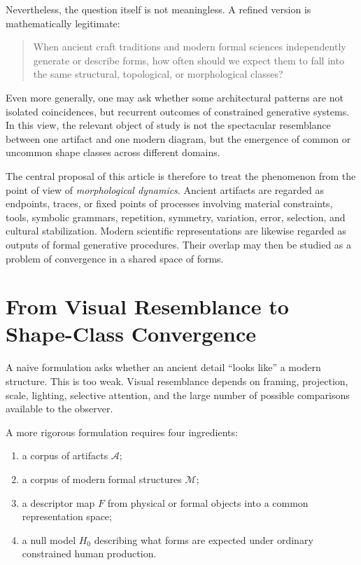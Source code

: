 \documentclass[11pt,a4paper]{article}
\begin{document}
Nevertheless, the question itself is not meaningless. A refined version is mathematically legitimate:
\begin{quote}
When ancient craft traditions and modern formal sciences independently generate or describe forms, how often should we expect them to fall into the same structural, topological, or morphological classes?
\end{quote}

Even more generally, one may ask whether some architectural patterns are not isolated coincidences, but recurrent outcomes of constrained generative systems. In this view, the relevant object of study is not the spectacular resemblance between one artifact and one modern diagram, but the emergence of common or uncommon shape classes across different domains.

The central proposal of this article is therefore to treat the phenomenon from the point of view of \emph{morphological dynamics}. Ancient artifacts are regarded as endpoints, traces, or fixed points of processes involving material constraints, tools, symbolic grammars, repetition, symmetry, variation, error, selection, and cultural stabilization. Modern scientific representations are likewise regarded as outputs of formal generative procedures. Their overlap may then be studied as a problem of convergence in a shared space of forms.

\section{From Visual Resemblance to Shape-Class Convergence}

A naive formulation asks whether an ancient detail ``looks like'' a modern structure. This is too weak. Visual resemblance depends on framing, projection, scale, lighting, selective attention, and the large number of possible comparisons available to the observer.

A more rigorous formulation requires four ingredients:
\begin{enumerate}[label=(\roman*)]
    \item a corpus of artifacts $\mathcal{A}$;
    \item a corpus of modern formal structures $\mathcal{M}$;
    \item a descriptor map $F$ from physical or formal objects into a common representation space;
    \item a null model $H_0$ describing what forms are expected under ordinary constrained human production.
\end{enumerate}
\end{document}
